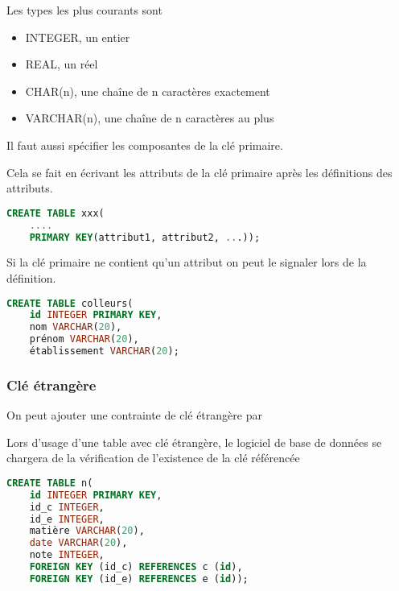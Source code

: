 Les types les plus courants sont
\begin{itemize}
\item INTEGER, un entier
\item REAL, un réel
\item CHAR(n), une chaîne de n caractères exactement
\item VARCHAR(n), une chaîne de n caractères au plus
\end{itemize}
Il faut aussi spécifier les composantes de la clé primaire. 

Cela se fait en écrivant les attributs de la clé primaire après les définitions des attributs. 
\begin{lstlisting}[language=SQL]
CREATE TABLE xxx(
    ....
    PRIMARY KEY(attribut1, attribut2, ...));
\end{lstlisting}
Si la clé primaire ne contient qu'un attribut on peut le signaler lors de la définition.
\begin{lstlisting}[language=SQL]
CREATE TABLE colleurs(
    id INTEGER PRIMARY KEY,
    nom VARCHAR(20),
    prénom VARCHAR(20),
    établissement VARCHAR(20);
\end{lstlisting}
\subsubsection{Clé étrangère}
On peut ajouter une contrainte de clé étrangère par


Lors d'usage d'une table avec clé étrangère, le logiciel de base de données se chargera de la  vérification de l'existence de la clé référencée
\begin{lstlisting}[language=SQL]
CREATE TABLE n(
    id INTEGER PRIMARY KEY,
    id_c INTEGER,
    id_e INTEGER,
    matière VARCHAR(20),
    date VARCHAR(20),
    note INTEGER,
    FOREIGN KEY (id_c) REFERENCES c (id),
    FOREIGN KEY (id_e) REFERENCES e (id));
\end{lstlisting}

